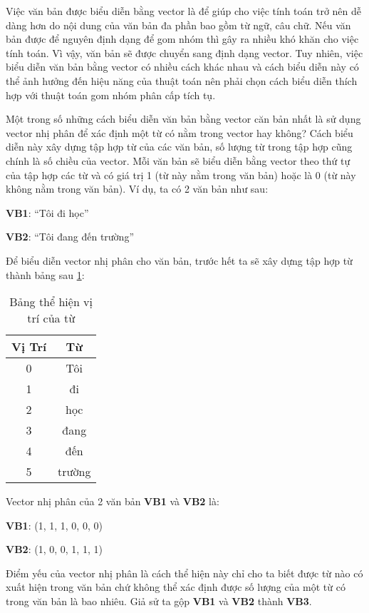 Việc văn bản được biểu diễn bằng vector là để giúp cho việc tính toán trở nên dễ dàng hơn do nội dung của văn bản đa phần bao gồm từ ngữ, câu chữ.
Nếu văn bản được để nguyên định dạng để gom nhóm thì gây ra nhiều khó khăn cho việc tính toán.
Vì vậy, văn bản sẽ được chuyển sang định dạng vector.
Tuy nhiên, việc biểu diễn văn bản bằng vector có nhiều cách khác nhau và cách biểu diễn này có thể ảnh hưởng đến hiệu năng của thuật toán nên phải chọn cách biểu diễn thích hợp với thuật toán gom nhóm phân cấp tích tụ.

Một trong số những cách biểu diễn văn bản bằng vector căn bản nhất là sử dụng vector nhị phân để xác định một từ có nằm trong vector hay không?
Cách biểu diễn này xây dựng tập hợp từ của các văn bản, số lượng từ trong tập hợp cũng chính là số chiều của vector.
Mỗi văn bản sẽ biểu diễn bằng vector theo thứ tự của tập hợp các từ và có giá trị 1 (từ này nằm trong văn bản) hoặc là 0 (từ này không nằm trong văn bản).
Ví dụ, ta có 2 văn bản như sau:

\textbf{VB1}: ``Tôi đi học''

\textbf{VB2}: ``Tôi đang đến trường''

Để biểu diễn vector nhị phân cho văn bản, trước hết ta sẽ xây dựng tập hợp từ thành bảng sau \ref{tab:3_1}:
\begin{table}[h!]
\centering
\caption{Bảng thể hiện vị trí của từ}
\label{tab:3_1}
\begin{tabular}{|c|c|}
\hline
Vị Trí & Từ							\\ \hline
0    & Tôi                \\ \hline
1    & đi               \\ \hline
2    & học               \\ \hline
3    & đang               \\ \hline
4    & đến               \\ \hline
5    & trường               \\ \hline
\end{tabular}
\end{table}

Vector nhị phân của 2 văn bản \textbf{VB1} và \textbf{VB2} là:

\textbf{VB1}: (1, 1, 1, 0, 0, 0)

\textbf{VB2}: (1, 0, 0, 1, 1, 1)

Điểm yếu của vector nhị phân là cách thể hiện này chỉ cho ta biết được từ nào có xuất hiện trong văn bản chứ không thể xác định được số lượng của một từ có trong văn bản là bao nhiêu.
Giả sử ta gộp \textbf{VB1} và \textbf{VB2} thành \textbf{VB3}.

